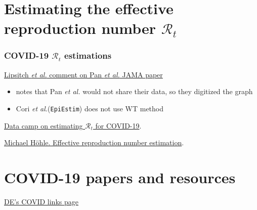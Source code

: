 \documentclass[12pt]{article}
\newcommand{\R}{{\mathcal R}}
\newcommand{\etal}{\emph{et al.}\/\xspace}
\begin{document}
\section*{Estimating the effective reproduction number $\R_t$}




\subsubsection*{COVID-19 $\R_t$ estimations}


\href{https://github.com/keyajoshi/Pan_response}{Lipsitch \etal
  comment on Pan \etal JAMA paper}
{\footnotesize\parskip=0pt
\begin{itemize}\itemsep0pt
\item notes that Pan \etal would not share their data, so they digitized the graph
\item Cori \etal (\texttt{EpiEstim}) does not use WT method
\end{itemize}
}

\href{https://www.datacamp.com/community/tutorials/replicating-in-r-covid19}{Data camp on estimating $\R_t$ for COVID-19}.

\href{https://staff.math.su.se/hoehle/blog/2020/04/15/effectiveR0.html}{Michael Höhle.  Effective reproduction number estimation}.

\section*{COVID-19 papers and resources}



\href{https://github.com/mac-theobio/Lab_meeting/blob/master/covid-19/README.md}{DE's COVID links page}



\end{document}
